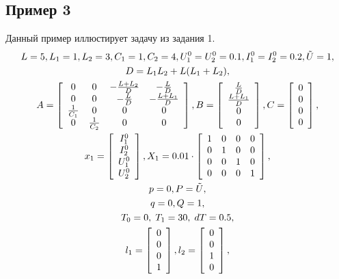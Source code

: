 \documentclass[12pt]{article}
\theoremstyle{rusdef}
\begin{document}
\subsection{Пример 3}
Данный пример иллюстирует задачу из задания 1.
\begin{gather}
L = 5, L_1 = 1, L_2 = 3, C_1 = 1, C_2 = 4, U_1^0 = U_2^0 = 0.1, I_1^0 = I_2^0 = 0.2, \tilde{U} = 1, \notag \\
D = L_1 L_2 + L (L_1 + L_2), \notag \\
A = \left[
\begin{array}{cccc}
	0 & 0 & -\frac{L+L_2}{D} & -\frac{L}{D} \\
	0 & 0 & -\frac{L}{D} & -\frac{L+L_1}{D} \\
	\frac{1}{C_1} & 0 & 0 & 0 \\
	0 & \frac{1}{C_2} & 0 & 0
\end{array}
\right],
B = \left[
\begin{array}{cccc}
	\frac{L}{D} \\
	\frac{L+L_1}{D} \\
	0 \\
	0
\end{array}
\right],
C = \left[
\begin{array}{c}
	0 \\
	0 \\
	0 \\
	0
\end{array}
\right], \notag \\
x_1 = \left[
\begin{array}{c}
	I_1^0 \\
	I_2^0 \\
	U_1^0 \\
	U_2^0
\end{array}
\right],
X_1 = 0.01 \cdot \left[
\begin{array}{cccc}
	1 & 0 & 0 & 0 \\
	0 & 1 & 0 & 0 \\
	0 & 0 & 1 & 0 \\
	0 & 0 & 0 & 1
\end{array}
\right], \notag \\
p = 0,
P = \tilde{U}, \notag \\
q = 0,
Q = 1, \notag \\
T_0 = 0, \; T_1 = 30, \; dT = 0.5, \notag \\
l_1 = \left[
\begin{array}{c}
	0 \\
	0 \\
	0 \\
	1
\end{array}
\right],
l_2 = \left[
\begin{array}{c}
	0 \\
	0 \\
	1 \\
	0
\end{array}
\right], \notag
\end{gather}
\end{document}

